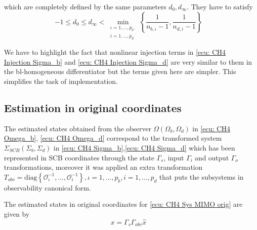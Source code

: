 \documentclass[11pt,letterpaper,twoside,openright]{report}
\begin{document}
which are completely defined by the same parameters $d_0,d_{\infty}$. They have to satisfy
\begin{equation}\label{ecu: CH4 d0dinf}
	-1\leq d_0 \leq d_{\infty} < \min_{\begin{array}{ll}
			\iota=1,...,p_b, \\
			i=1,...,p_d
	\end{array} } 
	\left\{ \frac{1}{n_{b,\iota}-1},\frac{1}{n_{d,i}-1}  \right\}
\end{equation}

We have to highlight the fact that nonlinear injection terms in \eqref{ecu: CH4 Injection Sigma_b} and \eqref{ecu: CH4 Injection Sigma_d} are very similar to them in the bl-homogeneous differentiator \cite{Moreno2021} but the terms given here are simpler. This simplifies the task of implementation.

\subsection{Estimation in original coordinates}
The estimated states obtained from the observer $\Omega(\Omega_b,\Omega_d)$ in \eqref{ecu: CH4 Omega_b}, \eqref{ecu: CH4 Omega_d} correspond to the transformed system $\Sigma_{SCB}(\Sigma_b,\Sigma_d)$ in \eqref{ecu: CH4 Sigma_b},\eqref{ecu: CH4 Sigma_d} which has been represented in SCB coordinates through the state $\Gamma_s$, input $\Gamma_i$ and output $\Gamma_o$ transformations, moreover it was applied an extra transformation $T_{obv}=\text{diag}\left\lbrace \mathcal{O}_\iota^{-1},...,\mathcal{O}_i^{-1} \right\rbrace,\iota=1,...,p_b,i=1,...,p_d$ that puts the subsystems in observability canonical form.

The estimated states in original coordinates for \eqref{ecu: CH4 Sys MIMO orig} are given by
\begin{equation}
	x = \Gamma_s\Gamma_{obv}\hat{x}
\end{equation}

\newpage
\end{document}
